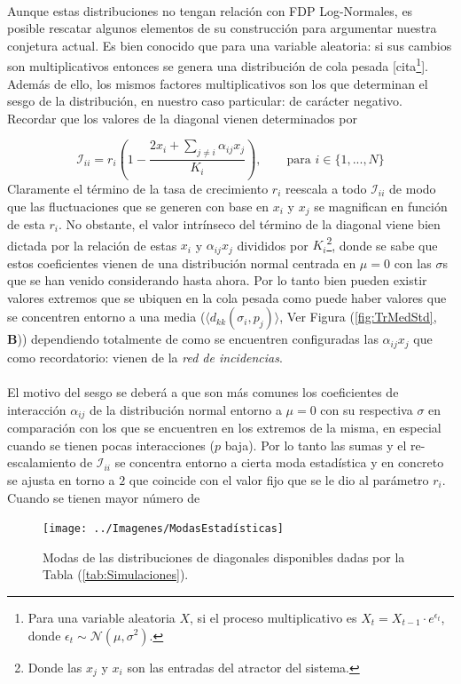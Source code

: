 \\
Aunque estas distribuciones no tengan relación con FDP Log-Normales, es posible rescatar algunos elementos de su construcción para argumentar nuestra conjetura actual. Es bien conocido que para una variable aleatoria: si sus cambios son multiplicativos entonces se genera una distribución de cola pesada [cita\footnote{Para una variable aleatoria $X$, si el proceso multiplicativo es $X_t=X_{t-1}\cdot e	^{\epsilon_t}$, donde $\epsilon_t\sim \mathcal{N}(\mu,\sigma^2)$.}]. Además de ello, los mismos factores multiplicativos son los que determinan el sesgo de la distribución, en nuestro caso particular: de carácter negativo. Recordar que los valores de la diagonal vienen determinados por

$$\mathcal{I}_{ii} = r_i \left (1-\frac{2x_i+\sum_{j\neq i}\alpha_{ij}x_j}{K_i}\right ),\qquad\text{para }i\in\{1,...,N\}$$
\newpage
Claramente el término de la tasa de crecimiento $r_i$ reescala a todo $\mathcal{I}_{ii}$ de modo que las fluctuaciones que se generen con base en $x_i$ y $x_j$ se magnifican en función de esta $r_i$. No obstante, el valor intrínseco del término de la diagonal viene bien dictada por la relación de estas $x_i$ y $\alpha_{ij}x_j$ divididos por $K_i$\footnote{Donde las $x_j$ y $x_i$ son las entradas del atractor del sistema.}, donde se sabe que estos coeficientes vienen de una distribución normal centrada en $\mu=0$ con las $\sigma$s que se han venido considerando hasta ahora. Por lo tanto bien pueden existir valores extremos que se ubiquen en la cola pesada como puede haber valores que se concentren entorno a una media ($\langle d_{kk}(\sigma_i,p_j)\rangle$, Ver Figura (\ref{fig:TrMedStd}, \textbf{B})) dependiendo totalmente de como se encuentren configuradas las $\alpha_{ij}x_j$ que como recordatorio: vienen de la \textit{red de incidencias}. \\
\\
El motivo del sesgo se deberá a que son más comunes los coeficientes de interacción $\alpha_{ij}$ de la distribución normal entorno a $\mu=0$ con su respectiva $\sigma$ en comparación con los que se encuentren en los extremos de la misma, en especial cuando se tienen pocas interacciones ($p$ baja). Por lo tanto las sumas y el re-escalamiento de $\mathcal{I}_{ii}$ se concentra entorno a cierta moda estadística y en concreto	se ajusta en torno a $2$ que coincide con el valor fijo que se le dio al parámetro $r_i$. Cuando se tienen mayor número de 
\begin{figure} \vspace{-30pt} \begin{center}
		\texttt{[image: ../Imagenes/ModasEstadísticas]}
	\end{center}
	\vspace{-20pt} 
	\caption{Modas de las distribuciones de diagonales disponibles dadas por la Tabla (\ref{tab:Simulaciones}).}
	\vspace{-10pt}
	\label{fig:ModasEstadísticas}
\end{figure}
